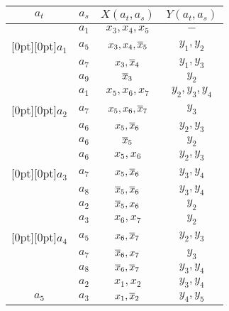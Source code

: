 \begin{table*}\small %
\begin{center}
\begin{minipage}[t]{190pt}
\vspace*{2ex}
\vspace*{10pt}

\tabcolsep=12pt
\begin{tabular}{|c|c|c|c|}
\hline
$a_t$ & $a_s$ & $X(a_t,a_s)$ & $Y(a_t,a_s)$ \\
\hline
& $a_1$ & $x_3,x_4,x_5$ & $-$\\
\multicolumn{1}{|c|}{\raisebox{-6pt}[0pt][0pt]{$a_1$}}  & $a_5$ & $x_3,x_4,\overline x_5$ & $y_1,y_2$\\
 & $a_7$ & $x_3,\overline x_4$ & $y_1,y_3$\\
 & $a_9$ & $\overline x_3$ & $y_2$\\
\hline
 & $a_1$ & $x_5,x_6,x_7$ & $y_2,y_3,y_4$\\
\multicolumn{1}{|c|}{\raisebox{-6pt}[0pt][0pt]{$a_2$}} & $a_7$ & $x_5,x_6,\overline x_7$ & $y_3$\\
 & $a_6$ & $x_5,\overline x_6$ & $y_2,y_3$\\
 & $a_6$ & $\overline x_5$ & $y_2$\\
\hline
 & $a_6$ & $x_5,x_6$ & $y_2,y_3$\\
\multicolumn{1}{|c|}{\raisebox{-6pt}[0pt][0pt]{$a_3$}} & $a_7$ & $x_5,\overline x_6$ & $y_3,y_4$\\
 & $a_8$ & $\overline x_5,\overline x_6$ & $y_3,y_4$\\
 & $a_2$ & $\overline x_5,x_6$ & $y_2$\\
\hline
 & $a_3$ & $x_6,x_7$ & $y_2$\\
\multicolumn{1}{|c|}{\raisebox{-6pt}[0pt][0pt]{$a_4$}} & $a_5$ & $x_6,\overline x_7$ & $y_2,y_3$\\
 & $a_7$ & $\overline x_6,x_7$ & $y_3$\\
 & $a_8$ & $\overline x_6,\overline x_7$ & $y_3,y_4$\\
\hline
   & $a_2$ & $x_1,x_2$ & $y_3,y_4$ \\
$a_5$ & $a_3$ & $x_1,\overline x_2$ & $y_4,y_5$ \\

\end{tabular}
\end{minipage}
\end{center}
\end{table*}
